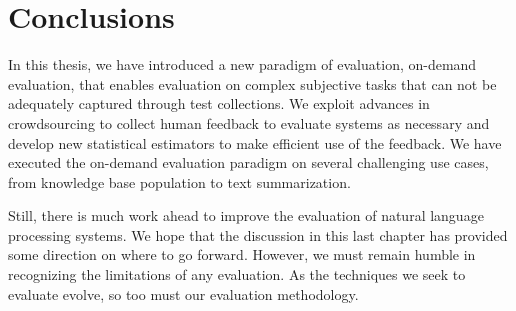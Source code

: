 \section{Conclusions}
In this thesis, we have introduced a new paradigm of evaluation, on-demand evaluation, that enables evaluation on complex subjective  tasks that can not be adequately captured through test collections.
We exploit advances in crowdsourcing to collect human feedback to evaluate systems as necessary and develop new statistical estimators to make efficient use of the feedback.
We have executed the on-demand evaluation paradigm on several challenging use cases, from knowledge base population to text summarization.

Still, there is much work ahead to improve the evaluation of natural language processing systems.
We hope that the discussion in this last chapter has provided some direction on where to go forward.
However, we must remain humble in recognizing the limitations of any evaluation.
As the techniques we seek to evaluate evolve, so too must our evaluation methodology.
